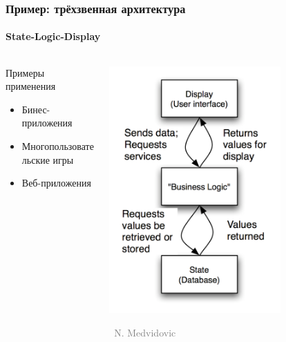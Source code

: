 \documentclass[xetex,mathserif,serif]{beamer}
\newcommand{\attribution}[1] {
	\vspace{-5mm}\begin{flushright}\begin{scriptsize}\textcolor{gray}{\textcopyright\, #1}\end{scriptsize}\end{flushright}
}
\begin{document}
	\begin{frame}
		\frametitle{Пример: трёхзвенная архитектура}
		\framesubtitle{State-Logic-Display}
		\begin{columns}
			\begin{column}{0.5\textwidth}
				Примеры применения
				\begin{itemize}
					\item Бинес-приложения
					\item Многопользовательские игры
					\item Веб-приложения
				\end{itemize}
			\end{column}
			\begin{column}{0.5\textwidth}
				\begin{center}
					\includegraphics[width=0.7\textwidth]{threeTieredArchitecture.png}
					\attribution{N. Medvidovic}
				\end{center}
			\end{column}
		\end{columns}
	\end{frame}
\end{document}
